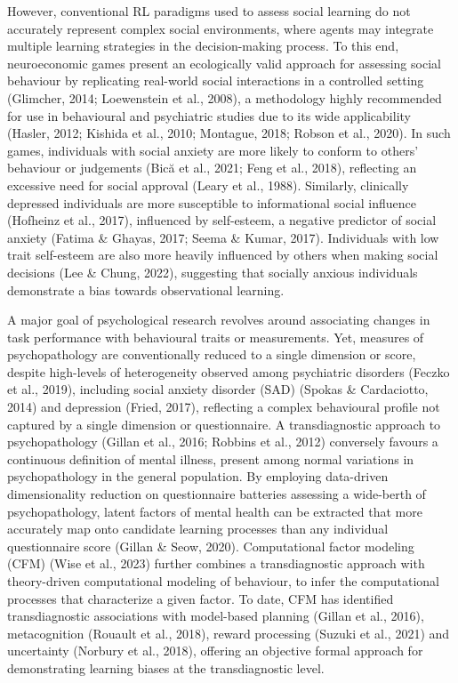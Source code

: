 \documentclass[12pt,a4paper,oneside,]{book} %
\begin{document}
However, conventional RL paradigms used to assess social learning do not accurately represent complex social environments, where agents may integrate multiple learning strategies in the decision-making process. To this end, neuroeconomic games present an ecologically valid approach for assessing social behaviour by replicating real-world social interactions in a controlled setting (Glimcher, 2014; Loewenstein et al., 2008), a methodology highly recommended for use in behavioural and psychiatric studies due to its wide applicability (Hasler, 2012; Kishida et al., 2010; Montague, 2018; Robson et al., 2020). In such games, individuals with social anxiety are more likely to conform to others' behaviour or judgements (Bică et al., 2021; Feng et al., 2018), reflecting an excessive need for social approval (Leary et al., 1988). Similarly, clinically depressed individuals are more susceptible to informational social influence (Hofheinz et al., 2017), influenced by self-esteem, a negative predictor of social anxiety (Fatima \& Ghayas, 2017; Seema \& Kumar, 2017). Individuals with low trait self-esteem are also more heavily influenced by others when making social decisions (Lee \& Chung, 2022), suggesting that socially anxious individuals demonstrate a bias towards observational learning.

A major goal of psychological research revolves around associating changes in task performance with behavioural traits or measurements. Yet, measures of psychopathology are conventionally reduced to a single dimension or score, despite high-levels of heterogeneity observed among psychiatric disorders (Feczko et al., 2019), including social anxiety disorder (SAD) (Spokas \& Cardaciotto, 2014) and depression (Fried, 2017), reflecting a complex behavioural profile not captured by a single dimension or questionnaire. A transdiagnostic approach to psychopathology (Gillan et al., 2016; Robbins et al., 2012) conversely favours a continuous definition of mental illness, present among normal variations in psychopathology in the general population. By employing data-driven dimensionality reduction on questionnaire batteries assessing a wide-berth of psychopathology, latent factors of mental health can be extracted that more accurately map onto candidate learning processes than any individual questionnaire score (Gillan \& Seow, 2020). Computational factor modeling (CFM) (Wise et al., 2023) further combines a transdiagnostic approach with theory-driven computational modeling of behaviour, to infer the computational processes that characterize a given factor. To date, CFM has identified transdiagnostic associations with model-based planning (Gillan et al., 2016), metacognition (Rouault et al., 2018), reward processing (Suzuki et al., 2021) and uncertainty (Norbury et al., 2018), offering an objective formal approach for demonstrating learning biases at the transdiagnostic level.
\end{document}
